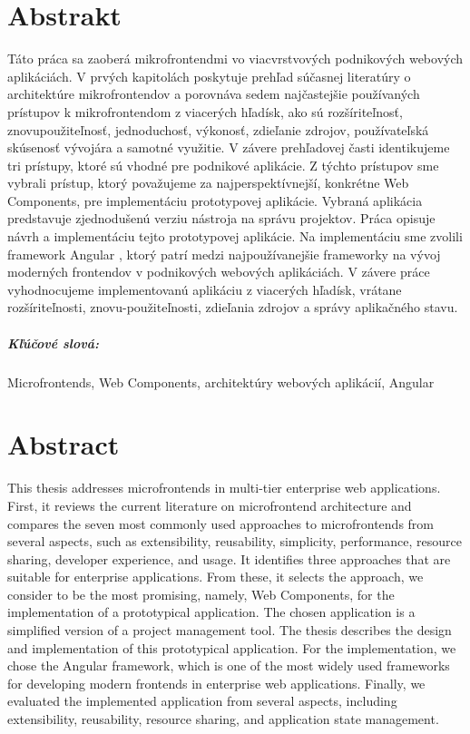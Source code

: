 \documentclass[12pt, oneside]{book}  %
\begin{document}
\vfill\eject 

\newpage 
\thispagestyle{empty}
\chapter*{Abstrakt}\label{chap:abstract_sk}
Táto práca sa zaoberá mikrofrontendmi vo viacvrstvových podnikových webových aplikáciách. V prvých kapitolách poskytuje prehľad súčasnej literatúry o architektúre mikrofrontendov a porovnáva sedem najčastejšie používaných prístupov k mikrofrontendom z viacerých hľadísk, ako sú rozšíriteľnosť, znovupoužiteľnosť, jednoduchosť, výkonosť, zdieľanie zdrojov, používateľská skúsenosť vývojára a samotné využitie. V závere prehľadovej časti identikujeme tri prístupy, ktoré sú vhodné pre podnikové aplikácie. Z týchto prístupov sme vybrali prístup, ktorý považujeme za najperspektívnejší, konkrétne Web Components, pre implementáciu prototypovej aplikácie. Vybraná aplikácia predstavuje zjednodušenú verziu nástroja na správu projektov. Práca opisuje návrh a implementáciu tejto prototypovej aplikácie. Na implementáciu sme zvolili framework Angular \cite{Angular}, ktorý patrí medzi najpoužívanejšie frameworky na vývoj moderných frontendov v podnikových webových aplikáciách. V závere práce vyhodnocujeme implementovanú aplikáciu z viacerých hľadísk, vrátane rozšíriteľnosti, znovu-použiteľnosti, zdieľania zdrojov a správy aplikačného stavu.

\paragraph*{Kľúčové slová:} Microfrontends, Web Components, architektúry webových aplikácií, Angular


\newpage 
\thispagestyle{empty}
\chapter*{Abstract}\label{chap:abstract_en}
This thesis addresses microfrontends in multi-tier enterprise web applications. First, it reviews the current literature on microfrontend architecture and compares the seven most commonly used approaches to microfrontends from several aspects, such as extensibility, reusability, simplicity, performance, resource sharing, developer experience, and usage. It identifies three approaches that are suitable for enterprise applications. From these, it selects the approach, we consider to be the most promising, namely, Web Components, for the implementation of a prototypical application. The chosen application is a simplified version of a project management tool. The thesis describes the design and implementation of this prototypical application. For the implementation, we chose the Angular \cite{Angular} framework, which is one of the most widely used frameworks for developing modern frontends in enterprise web applications. Finally, we evaluated the implemented application from several aspects, including extensibility, reusability, resource sharing, and application state management.
\end{document}

